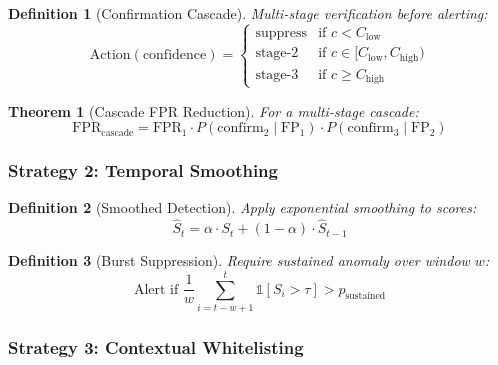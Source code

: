 \documentclass[
]{article}
\newtheorem{definition}{Definition}[section]
\newtheorem{theorem}{Theorem}[section]
\begin{document}
\begin{definition}[Confirmation Cascade]
\label{def:confirmation-cascade}
Multi-stage verification before alerting:
\begin{equation}
\label{eq:cascade-decision}
\text{Action}(\text{confidence}) = \begin{cases}
\text{suppress} & \text{if } c < C_{\text{low}} \\
\text{stage-2} & \text{if } c \in [C_{\text{low}}, C_{\text{high}}) \\
\text{stage-3} & \text{if } c \geq C_{\text{high}}
\end{cases}
\end{equation}
\end{definition}

\begin{theorem}[Cascade FPR Reduction]
\label{thm:cascade-fpr}
For a multi-stage cascade:
\begin{equation}
\label{eq:cascade-fpr}
\text{FPR}_{\text{cascade}} = \text{FPR}_1 \cdot P(\text{confirm}_2 \mid \text{FP}_1) \cdot P(\text{confirm}_3 \mid \text{FP}_2)
\end{equation}
\end{theorem}

\subsubsection{Strategy 2: Temporal
Smoothing}\label{strategy-2-temporal-smoothing}

\begin{definition}[Smoothed Detection]
\label{def:smoothed-detection}
Apply exponential smoothing to scores:
\begin{equation}
\label{eq:smoothed-score}
\hat{S}_t = \alpha \cdot S_t + (1 - \alpha) \cdot \hat{S}_{t-1}
\end{equation}
\end{definition}

\begin{definition}[Burst Suppression]
\label{def:burst-suppression}
Require sustained anomaly over window $w$:
\begin{equation}
\label{eq:burst-suppression}
\text{Alert if } \frac{1}{w} \sum_{i=t-w+1}^{t} \mathbb{1}[S_i > \tau] > p_{\text{sustained}}
\end{equation}
\end{definition}

\subsubsection{Strategy 3: Contextual
Whitelisting}\label{strategy-3-contextual-whitelisting}
\end{document}
